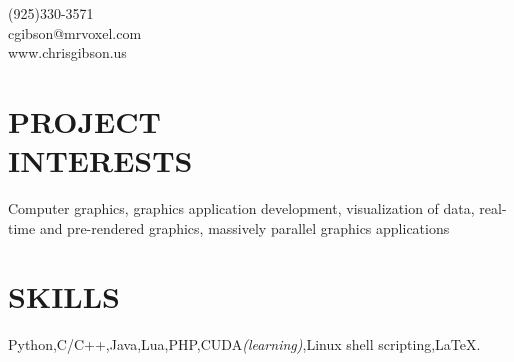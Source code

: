 \documentclass[margin,line]{resume}
\begin{document}
{
	\sc
    \hfill (925)330-3571                  \vspace{0mm}\\\vspace{0mm}%
    \hfill cgibson@mrvoxel.com            \vspace{0mm}\\\vspace{0mm}%
    \hfill www.chrisgibson.us             \vspace{0mm}\\\vspace{-10mm}%
}

\begin{resume}

\vspace{1mm}

    \section{\mysidestyle \textbf{\large{P}\small{ROJECT\\INTERESTS}}}

	Computer graphics, graphics application development, visualization of data, real-time and pre-rendered graphics, massively parallel graphics applications

\sectionline

    \section{\mysidestyle \textbf{\large{S}\small{KILLS}}}

    Python,\hspace{2mm}C/C++,\hspace{2mm}Java,\hspace{2mm}Lua,\hspace{2mm}PHP,\hspace{2mm}CUDA\textsl{\small(learning)},\hspace{2mm}Linux shell scripting,\hspace{2mm}\LaTeX.


\sectionline


\end{resume}
\end{document}
